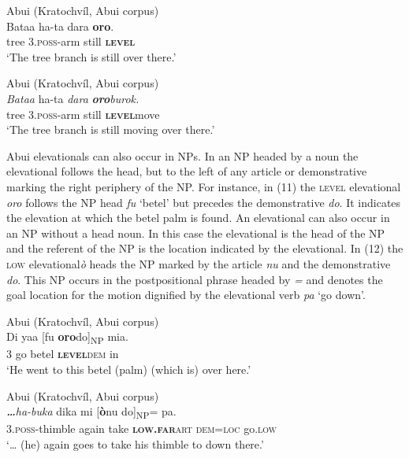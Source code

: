 \ea%
\label{ex:9}
  Abui (Kratochv\'il, Abui corpus)\\
\gll  Bataa   ha-ta {{\ng}} dara  \textbf{{oro}}{.} \\
       tree  3.\textsc{poss}{}-arm   still  \textbf{\textsc{level}} \\
\glt `The tree branch is still over there.'
\z





\ea
  Abui (Kratochv\'il, Abui corpus)\\
\gll \textit{Bataa}   ha-ta \textit{{\ng}} \textit{dara} \textbf{\textit{oro}}\textit{burok.}  \\
tree  3.\textsc{poss}{}-arm   still  \textbf{\textsc{level}}move  \\
\glt   `The tree branch is still moving over there.'
\z








Abui elevationals can also occur in NPs. In an NP headed by a noun the elevational follows the head, but to the left of any article or demonstrative marking the right periphery of the NP. For instance, in (11) the \textsc{level} elevational \textit{oro} follows the NP head \textit{fu} `betel' but precedes the demonstrative \textit{do}. It indicates the elevation at which the betel palm is found. An elevational can also occur in an NP without a head noun. In this case the elevational is the head of the NP and the referent of the NP is the location indicated by the elevational. In (12) the \textsc{low} elevational\textit {\`o} heads the NP marked by the article \textit{nu} and the demonstrative \textit{do}. This NP occurs in the postpositional phrase headed by \textit{={\ng}} and denotes the goal location for the motion dignified by the elevational verb \textit{pa} `go down'.



\ea%
\label{ex:11}
    Abui (Kratochv\'il, Abui corpus)    \\
\gll Di  yaa  [{fu} \textbf{{oro}}{do}]\textsubscript{NP} {mia.} \\
  \textsc{3} go   betel  \textbf{\textsc{level}}\textsc{dem} in  \\
\glt   `He went to this betel (palm) (which is) over here.'
\z









\ea%
\label{ex:12}
    Abui (Kratochv\'il, Abui corpus)   \\
\gll \textbf{\textit{{\dots}}}\textit{ha-buka}\textit{{\ng}} dika {{\ng}} mi     [\textbf{{\`o}}{nu}    {do}]\textsubscript{NP}{=}{{\ng}}    {pa.} \\
   3.\textsc{poss}{}-thimble  again  take  \textbf{\textsc{low.far}}\textsc   {art  dem=loc} go.\textsc{low}  \\
\glt `{\dots} (he) again goes to take his thimble to down there.'
\z







